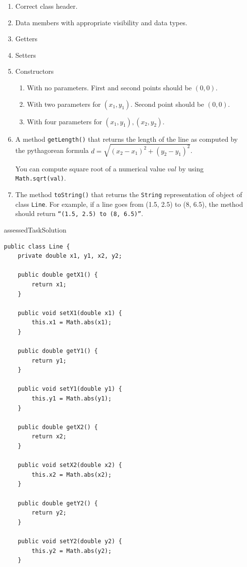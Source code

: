 \begin{questions}
\begin{enumerate}
\item Correct class header.
\item Data members with appropriate visibility and data types.
\item Getters
\item Setters
\item Constructors
	\begin{enumerate}
		\item With no parameters. First and second points should be $(0, 0)$.
		\item With two parameters for $(x_1, y_1)$. Second point should be $(0, 0)$.
		\item With four parameters for $(x_1, y_1), (x_2, y_2)$.
	\end{enumerate}
\item A method \texttt{getLength()} that returns the length of the line as computed by the pythagorean formula 
\vskip 0.5cm
$d = \sqrt{(x_2 - x_1)^2 + (y_2 - y_1)^2}$.

You can compute square root of a numerical value $val$ by using \texttt{Math.sqrt(val)}.

\item The method \texttt{toString()} that returns the \texttt{String} representation of object of class \texttt{Line}. For example, if a line goes from (1.5, 2.5) to (8, 6.5), the method should return \texttt{``(1.5, 2.5) to (8, 6.5)''}.
\end{enumerate}

\begin{taggedblock}{assessedTaskSolution}
\begin{solution}
\newpage
\begin{lstlisting}
public class Line {
	private double x1, y1, x2, y2;

	public double getX1() {
		return x1;
	}

	public void setX1(double x1) {
		this.x1 = Math.abs(x1);
	}

	public double getY1() {
		return y1;
	}

	public void setY1(double y1) {
		this.y1 = Math.abs(y1);
	}

	public double getX2() {
		return x2;
	}

	public void setX2(double x2) {
		this.x2 = Math.abs(x2);
	}

	public double getY2() {
		return y2;
	}

	public void setY2(double y2) {
		this.y2 = Math.abs(y2);
	}


\end{lstlisting}
\end{solution}
\end{taggedblock}
\end{questions}

